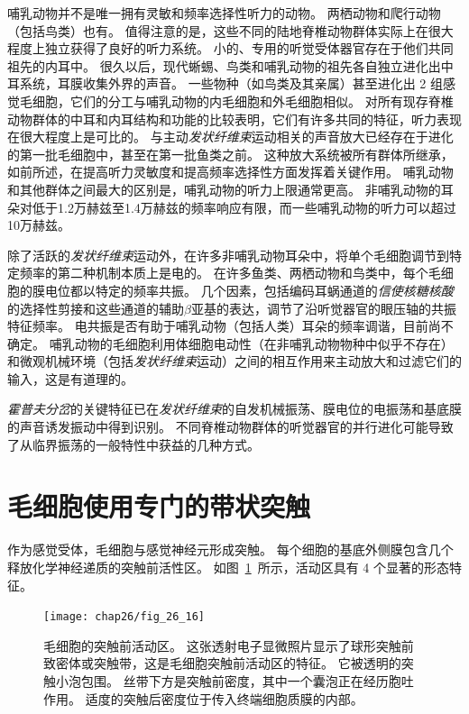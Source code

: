 \begin{proposition}[听觉的进化史导致了群体之间的相似性] \label{box:26_2}
	
	\quad \quad 哺乳动物并不是唯一拥有灵敏和频率选择性听力的动物。
	两栖动物和爬行动物（包括鸟类）也有。
	值得注意的是，这些不同的陆地脊椎动物群体实际上在很大程度上独立获得了良好的听力系统。
	小的、专用的听觉受体器官存在于他们共同祖先的内耳中。
	很久以后，现代蜥蜴、鸟类和哺乳动物的祖先各自独立进化出中耳系统，耳膜收集外界的声音。
	一些物种（如鸟类及其亲属）甚至进化出 2 组感觉毛细胞，它们的分工与哺乳动物的内毛细胞和外毛细胞相似。
	对所有现存脊椎动物群体的中耳和内耳结构和功能的比较表明，它们有许多共同的特征，听力表现在很大程度上是可比的。
	与主动\textit{发状纤维束}运动相关的声音放大已经存在于进化的第一批毛细胞中，甚至在第一批鱼类之前。
	这种放大系统被所有群体所继承，如前所述，在提高听力灵敏度和提高频率选择性方面发挥着关键作用。
	哺乳动物和其他群体之间最大的区别是，哺乳动物的听力上限通常更高。
	非哺乳动物的耳朵对低于1.2万赫兹至1.4万赫兹的频率响应有限，而一些哺乳动物的听力可以超过10万赫兹。
	
	\quad \quad 除了活跃的\textit{发状纤维束}运动外，在许多非哺乳动物耳朵中，将单个毛细胞调节到特定频率的第二种机制本质上是电的。
	在许多鱼类、两栖动物和鸟类中，每个毛细胞的膜电位都以特定的频率共振。
	几个因素，包括编码耳蜗通道的\textit{信使核糖核酸}的选择性剪接和这些通道的辅助$\beta$亚基的表达，调节了沿听觉器官的眼压轴的共振特征频率。
	电共振是否有助于哺乳动物（包括人类）耳朵的频率调谐，目前尚不确定。
	哺乳动物的毛细胞利用体细胞电动性（在非哺乳动物物种中似乎不存在）和微观机械环境（包括\textit{发状纤维束}运动）之间的相互作用来主动放大和过滤它们的输入，这是有道理的。
	
	\quad \quad \textit{霍普夫分岔}的关键特征已在\textit{发状纤维束}的自发机械振荡、膜电位的电振荡和基底膜的声音诱发振动中得到识别。
	不同脊椎动物群体的听觉器官的并行进化可能导致了从临界振荡的一般特性中获益的几种方式。
	
\end{proposition}


\section{毛细胞使用专门的带状突触}

作为感觉受体，毛细胞与感觉神经元形成突触。
每个细胞的基底外侧膜包含几个释放化学神经递质的突触前活性区。
如图~\ref{fig:26_16}~所示，活动区具有 4 个显著的形态特征。


\begin{figure}[htbp]
	\centering
	\texttt{[image: chap26/fig\_26\_16]}
	\caption{毛细胞的突触前活动区。
		这张透射电子显微照片显示了球形突触前致密体或突触带，这是毛细胞突触前活动区的特征。
		它被透明的突触小泡包围。
		丝带下方是突触前密度，其中一个囊泡正在经历胞吐作用。
		适度的突触后密度位于传入终端细胞质膜的内部。 }
	\label{fig:26_16}
\end{figure}


